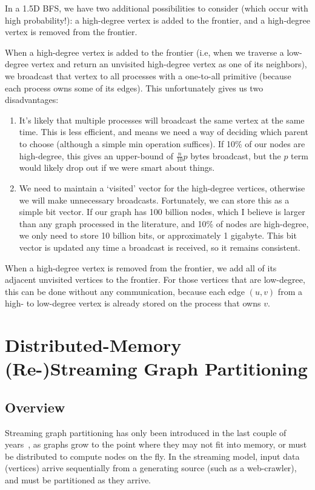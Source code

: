 \documentclass[11pt]{article}
\begin{document}
In a 1.5D BFS, we have two additional possibilities to consider (which occur with high probability!): a high-degree vertex is added to the frontier, and a high-degree vertex is removed from the frontier. 

When a high-degree vertex is added to the frontier (i.e, when we traverse a low-degree vertex and return an unvisited high-degree vertex as one of its neighbors), we broadcast that vertex to all processes with a one-to-all primitive (because each process owns some of its edges). This unfortunately gives us two disadvantages:

\begin{enumerate}
\item It's likely that multiple processes will broadcast the same vertex at the same time. This is less efficient, and means we need a way of deciding which parent to choose (although a simple min operation suffices). If 10\% of our nodes are high-degree, this gives an upper-bound of $\frac{n}{10}p$ bytes broadcast, but the $p$ term would likely drop out if we were smart about things.
\item We need to maintain a `visited' vector for the high-degree vertices, otherwise we will make unnecessary broadcasts. Fortunately, we can store this as a simple bit vector. If our graph has 100 billion nodes, which I believe is larger than any graph processed in the literature, and 10\% of nodes are high-degree, we only need to store 10 billion bits, or approximately 1 gigabyte. This bit vector is updated any time a broadcast is received, so it remains consistent. 
\end{enumerate}

When a high-degree vertex is removed from the frontier, we add all of its adjacent unvisited vertices to the frontier. For those vertices that are low-degree, this can be done without any communication, because each edge $(u,v)$ from a high- to low-degree vertex is already stored on the process that owns $v$. 

\newpage \section{Distributed-Memory (Re-)Streaming Graph Partitioning}
\subsection{Overview}
Streaming graph partitioning has only been introduced in the last couple of years~\cite{DBLP:journals/corr/abs-1212-1121,Stanton:2012:SGP:2339530.2339722,tsourakakis2012fennel}, as graphs grow to the point where they may not fit into memory, or must be distributed to compute nodes on the fly. In the streaming model, input data (vertices) arrive sequentially from a generating source (such as a web-crawler), and must be partitioned as they arrive.
\end{document}
